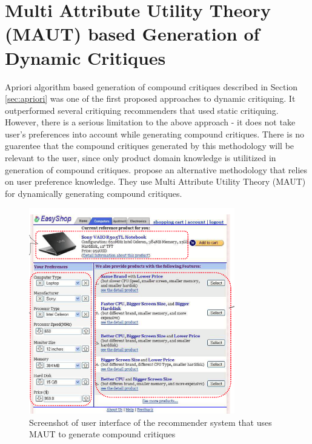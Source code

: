 \section{Multi Attribute Utility Theory (MAUT) based Generation of Dynamic Critiques}
\label{sec:maut}
Apriori algorithm based generation of compound critiques described in Section \ref{sec:apriori} was one of the first proposed approaches to dynamic critiquing.
It outperformed several critiquing recommenders that used static critiquing.
However, there is a serious limitation to the above approach - it does not take user's preferences into account while generating compound critiques.
There is no guarentee that the compound critiques generated by this methodology will be relevant to the user, since only product domain knowledge is utilitized in generation of compound critiques.
\cite{mautPaper} propose an alternative methodology that relies on user preference knowledge.
They use Multi Attribute Utility Theory (MAUT) for dynamically generating compound critiques.
\begin{figure}
  \centering
    \includegraphics[width=0.8\textwidth]{figures-bharath/maut.png}
  \caption{Screenshot of user interface of the recommender system that uses MAUT to generate compound critiques}
\label{fig:maut}
\end{figure}

